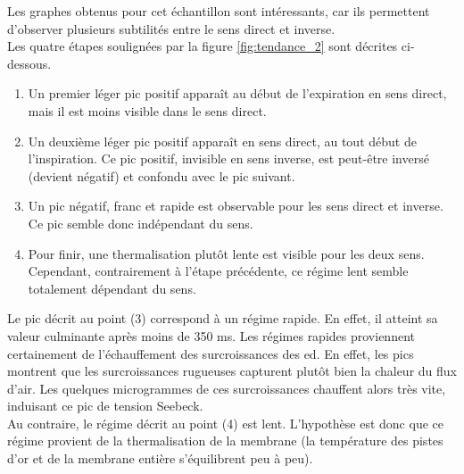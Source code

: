 Les graphes obtenus pour cet échantillon sont intéressants, car ils permettent d'observer plusieurs subtilités entre le sens direct et inverse. \\
Les quatre étapes soulignées par la figure \ref{fig:tendance_2} sont décrites ci-dessous. \\
\begin{enumerate}
    \item Un premier léger pic positif apparaît au début de l'expiration en sens direct, mais il est moins visible dans le sens direct.
    \item Un deuxième léger pic positif apparaît en sens direct, au tout début de l'inspiration. Ce pic positif, invisible en sens inverse, est
          peut-être inversé (devient négatif) et confondu avec le pic suivant. \\
    \item Un pic négatif, franc et rapide est observable pour les sens direct et inverse. Ce pic semble donc indépendant du sens. \\
    \item Pour finir, une thermalisation plutôt lente est visible pour les deux sens. Cependant, contrairement à l'étape précédente, ce régime
          lent semble totalement dépendant du sens. 
\end{enumerate}
Le pic décrit au point (3) correspond à un régime rapide. En effet, il atteint sa valeur culminante après moins de 350 ms. Les régimes 
rapides proviennent certainement de l'échauffement des surcroissances des \gls{ed}. En effet, les pics montrent que les surcroissances rugueuses 
capturent plutôt bien la chaleur du flux d'air. Les quelques microgrammes de ces surcroissances chauffent alors très vite, induisant ce pic de 
tension Seebeck. \\

Au contraire, le régime décrit au point (4) est lent. L'hypothèse est donc que ce régime provient de la thermalisation de la membrane (la 
température des pistes d'or et de la membrane entière s'équilibrent peu à peu). \\

